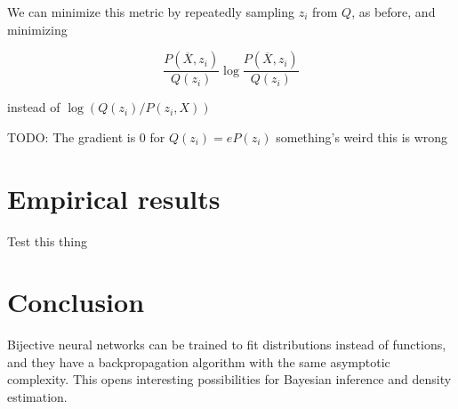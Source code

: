 \documentclass{article}
\begin{document}
We can minimize this metric by repeatedly sampling \(z_i\) from \(Q\),
as before, and minimizing

\[
  \frac{P(\overline{X}, z_i)}{Q(z_i)} \log \frac{P(\overline{X}, z_i)}{Q(z_i)}
\]

instead of \(\log(Q(z_i)/P(z_i, X))\)

TODO: The gradient is 0 for \(Q(z_i) = e P(z_i)\) something's weird this is wrong


\section{Empirical results}

Test this thing


\section{Conclusion}

Bijective neural networks can be trained to fit distributions instead of
functions, and they have a backpropagation algorithm with the same asymptotic
complexity. This opens interesting possibilities for Bayesian inference and
density estimation.
\end{document}
